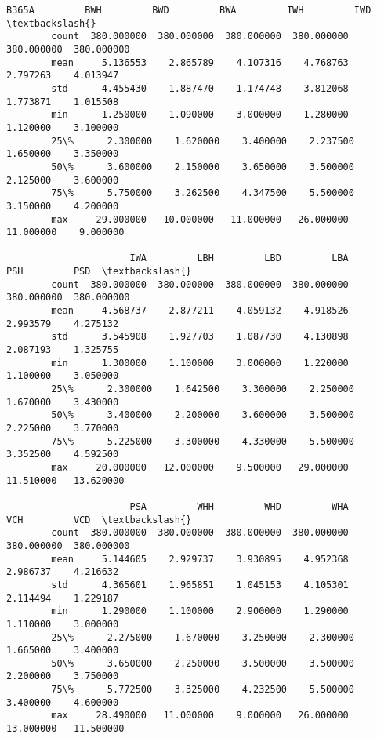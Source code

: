 \documentclass[11pt]{article}
\begin{document}
\begin{Verbatim}[commandchars=\\\{\}]
                    B365A         BWH         BWD         BWA         IWH         IWD  \textbackslash{}
        count  380.000000  380.000000  380.000000  380.000000  380.000000  380.000000   
        mean     5.136553    2.865789    4.107316    4.768763    2.797263    4.013947   
        std      4.455430    1.887470    1.174748    3.812068    1.773871    1.015508   
        min      1.250000    1.090000    3.000000    1.280000    1.120000    3.100000   
        25\%      2.300000    1.620000    3.400000    2.237500    1.650000    3.350000   
        50\%      3.600000    2.150000    3.650000    3.500000    2.125000    3.600000   
        75\%      5.750000    3.262500    4.347500    5.500000    3.150000    4.200000   
        max     29.000000   10.000000   11.000000   26.000000   11.000000    9.000000   
        
                      IWA         LBH         LBD         LBA         PSH         PSD  \textbackslash{}
        count  380.000000  380.000000  380.000000  380.000000  380.000000  380.000000   
        mean     4.568737    2.877211    4.059132    4.918526    2.993579    4.275132   
        std      3.545908    1.927703    1.087730    4.130898    2.087193    1.325755   
        min      1.300000    1.100000    3.000000    1.220000    1.100000    3.050000   
        25\%      2.300000    1.642500    3.300000    2.250000    1.670000    3.430000   
        50\%      3.400000    2.200000    3.600000    3.500000    2.225000    3.770000   
        75\%      5.225000    3.300000    4.330000    5.500000    3.352500    4.592500   
        max     20.000000   12.000000    9.500000   29.000000   11.510000   13.620000   
        
                      PSA         WHH         WHD         WHA         VCH         VCD  \textbackslash{}
        count  380.000000  380.000000  380.000000  380.000000  380.000000  380.000000   
        mean     5.144605    2.929737    3.930895    4.952368    2.986737    4.216632   
        std      4.365601    1.965851    1.045153    4.105301    2.114494    1.229187   
        min      1.290000    1.100000    2.900000    1.290000    1.110000    3.000000   
        25\%      2.275000    1.670000    3.250000    2.300000    1.665000    3.400000   
        50\%      3.650000    2.250000    3.500000    3.500000    2.200000    3.750000   
        75\%      5.772500    3.325000    4.232500    5.500000    3.400000    4.600000   
        max     28.490000   11.000000    9.000000   26.000000   13.000000   11.500000   
        

\end{Verbatim}
\end{document}
